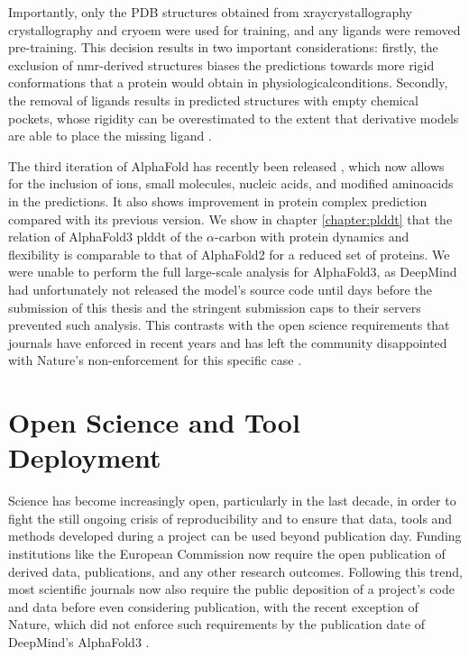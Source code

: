 Importantly, only the PDB structures obtained from \gls{xraycrystallography} crystallography and \gls{cryoem} were used for training, and any \glspl{ligand} were removed pre-training. This decision results in two important considerations: firstly, the exclusion of \gls{nmr}-derived structures biases the predictions towards more rigid \glspl{conformation} that a protein would obtain in \gls{physiologicalconditions}. Secondly, the removal of \glspl{ligand} results in predicted structures with empty chemical pockets, whose rigidity can be overestimated to the extent that derivative models are able to place the missing \gls{ligand} \cite{hekkelman_alphafill_2023}.


The third iteration of AlphaFold has recently been released \cite{abramson_accurate_2024}, which now allows for the inclusion of ions, small molecules, nucleic acids, and modified \glspl{aminoacid} in the predictions. It also shows improvement in protein complex prediction compared with its previous version. We show in chapter \ref{chapter:plddt} that the relation of AlphaFold3 \gls{plddt} of the $\alpha\text{-carbon}$ with protein \gls{dynamics} and \gls{flexibility} is comparable to that of AlphaFold2 for a reduced set of proteins. We were unable to perform the full large-scale analysis for AlphaFold3, as DeepMind had unfortunately not released the model's source code \cite{noauthor_alphafold3_2024} until days before the submission of this thesis \cite{callaway_ai_2024} and the stringent submission caps to their servers prevented such analysis. This contrasts with the open science requirements that journals have enforced in recent years and has left the community disappointed with Nature's non-enforcement for this specific case \cite{lin_alphafold_2024, wankowicz_alphafold3_2024}.

\section{Open Science and Tool Deployment}

Science has become increasingly open, particularly in the last decade, in order to fight the still ongoing crisis of reproducibility and to ensure that data, tools and methods developed during a project can be used beyond publication day. Funding institutions like the European Commission now require the open publication of derived data, publications, and any other research outcomes. Following this trend, most scientific journals now also require the public deposition of a project’s code and data before even considering publication, with the recent exception of Nature, which did not enforce such requirements by the publication date of DeepMind’s AlphaFold3  \cite{noauthor_alphafold3_2024}.

